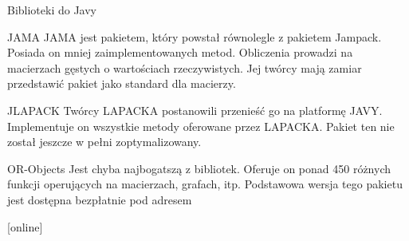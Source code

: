 	\begin{frame}[allowframebreaks]{Biblioteki do Javy}
		\begin{block}{JAMA}
			JAMA jest pakietem, który powstał równolegle z pakietem Jampack. Posiada on mniej zaimplementowanych metod. Obliczenia prowadzi na macierzach gęstych o wartościach rzeczywistych. Jej twórcy mają zamiar przedstawić pakiet jako standard dla macierzy. 
			
		\end{block}
		\begin{block}{JLAPACK}
			Twórcy LAPACKA postanowili przenieść go na platformę JAVY. Implementuje on wszystkie metody oferowane przez LAPACKA. Pakiet ten nie został jeszcze w pełni zoptymalizowany. 
			
		\end{block}
		\begin{block}{OR-Objects}
			Jest chyba najbogatszą z bibliotek. Oferuje on ponad 450 różnych funkcji operujących na macierzach, grafach, itp. Podstawowa wersja tego pakietu jest dostępna bezpłatnie pod adresem
			\begin{thebibliography}{9}
		\end{thebibliography}
		\end{block}
		
	\end{frame}